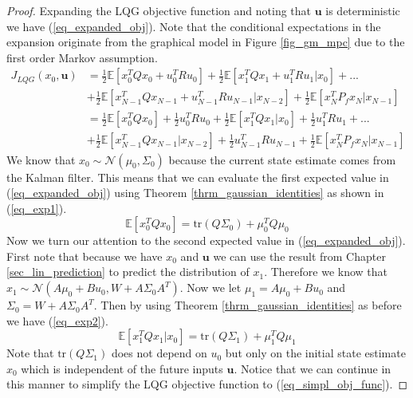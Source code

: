 \begin{proof}
Expanding the LQG objective function and noting that $\mathbf{u}$ is deterministic we have (\ref{eq_expanded_obj}). Note that the conditional expectations in the expansion originate from the graphical model in Figure \ref{fig_gm_mpc} due to the first order Markov assumption. 
\begin{equation}
\begin{aligned}
J_{LQG}(x_0, \mathbf{u}) &= \frac{1}{2} \mathbb{E}\left[x_0^TQx_0 + u_0^TRu_0 \right] + \frac{1}{2} \mathbb{E}\left[x_1^TQx_1 + u_1^TRu_1 |x_0\right] + ... \\ &+ \frac{1}{2} \mathbb{E}\left[x_{N-1}^TQx_{N-1} + u_{N-1}^TRu_{N-1}|x_{N-2} \right] + \frac{1}{2} \mathbb{E}\left[x_N^TP_fx_N|x_{N-1} \right] \\
&= \frac{1}{2} \mathbb{E}\left[x_0^TQx_0\right] +\frac{1}{2} u_0^TRu_0 + \frac{1}{2} \mathbb{E}\left[x_1^TQx_1|x_0\right] + \frac{1}{2}u_1^TRu_1 + ... \\ &+ \frac{1}{2} \mathbb{E}\left[x_{N-1}^TQx_{N-1}|x_{N-2} \right]+ \frac{1}{2}u_{N-1}^TRu_{N-1} + \frac{1}{2} \mathbb{E}\left[x_N^TP_fx_N |x_{N-1}\right]
\end{aligned}
\label{eq_expanded_obj}
\end{equation}
We know that $x_0\sim \mathcal{N}(\mu_0, \Sigma_0)$ because the current state estimate comes from the Kalman filter. This means that we can evaluate the first expected value in (\ref{eq_expanded_obj}) using Theorem \ref{thrm_gaussian_identities} as shown in (\ref{eq_exp1}).
\begin{equation}
\mathbb{E}\left[x_0^TQx_0\right] = \text{tr}(Q\Sigma_0) + \mu_0^TQ\mu_0
\label{eq_exp1}
\end{equation} 
Now we turn our attention to the second expected value in (\ref{eq_expanded_obj}). First note that because we have $x_0$ and $\mathbf{u}$ we can use the result from Chapter \ref{sec_lin_prediction} to predict the distribution of $x_1$. Therefore we know that $x_1 \sim \mathcal{N}(A\mu_0+Bu_0, W+A\Sigma_0 A^T)$. Now we let $\mu_1 = A\mu_0+Bu_0$ and $\Sigma_0 = W+A\Sigma_0 A^T$. Then by using Theorem \ref{thrm_gaussian_identities} as before we have (\ref{eq_exp2}).
\begin{equation}
\mathbb{E}\left[x_1^TQx_1|x_0\right] = \text{tr}(Q\Sigma_1) + \mu_1^TQ\mu_1
\label{eq_exp2}
\end{equation} 
Note that $\text{tr}(Q\Sigma_1)$ does not depend on $u_0$ but only on the initial state estimate $x_0$ which is independent of the future inputs $\mathbf{u}$. Notice that we can continue in this manner to simplify the LQG objective function to (\ref{eq_simpl_obj_func}).

\end{proof}
